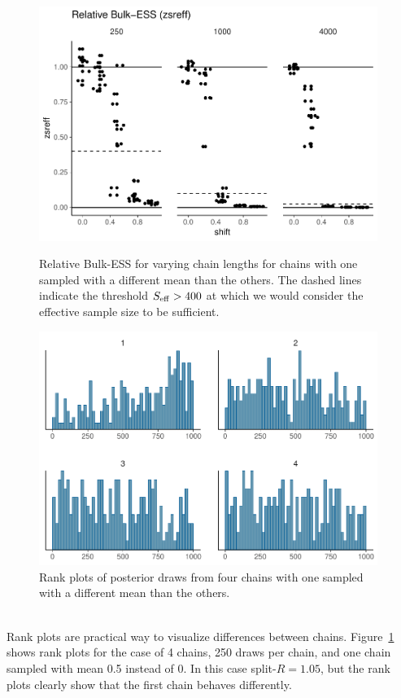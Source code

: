 \documentclass[american,]{article}
\theoremstyle{definition}
\begin{document}
\begin{figure}[tp]
  \centering
  \begin{minipage}{0.48\textwidth}
  \includegraphics[width=0.98\textwidth]{graphics/zsreff-shifted-chain-1.pdf}
  \caption{Relative Bulk-ESS for varying chain lengths for chains with one
    sampled with a different mean than the others. The dashed lines
    indicate the threshold \(S_{\rm eff} > 400\) at which we would
    consider the effective sample size to be sufficient.}
  \label{fig:zsreff-shifted-chain-1}
\end{minipage}
\hfill
  \begin{minipage}{0.48\textwidth}
  \includegraphics[width=0.98\textwidth]{graphics/hist-shifted-chain-1.pdf}
  \caption{Rank plots of posterior draws from four chains with one
    sampled with a different mean than the others.\\~\\}
  \label{fig:hist-shifted-chain-1}
\end{minipage}
\end{figure}
Rank plots are practical way to visualize differences between
chains. Figure~\ref{fig:hist-shifted-chain-1} shows rank plots for the
case of 4 chains, 250 draws per chain, and one chain sampled with mean
0.5 instead of 0. In this case split-\(\widehat{R} = 1.05\), but the
rank plots clearly show that the first chain behaves differently.
\end{document}
